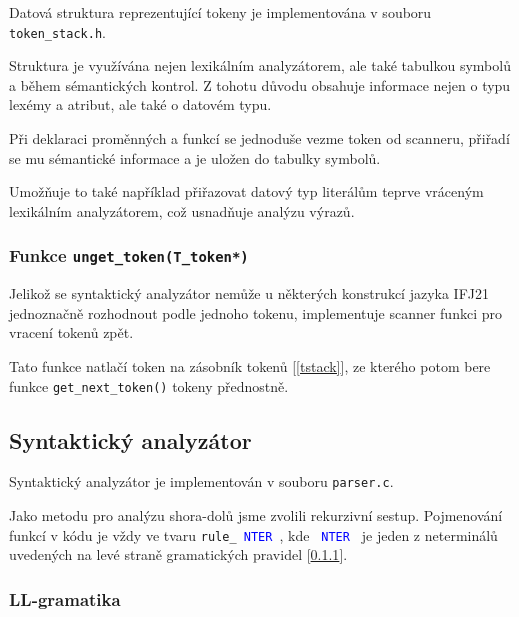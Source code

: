 \documentclass[a4paper]{article}
\theoremstyle{definition}
\newcommand{\nter}[1]{\textcolor{blue}{\,#1\,}}
\begin{document}
Datová struktura reprezentující tokeny je implementována v souboru \texttt{token\_stack.h}.

Struktura je využívána nejen lexikálním analyzátorem, ale také tabulkou symbolů a během sémantických kontrol. Z tohotu důvodu obsahuje informace nejen o typu lexémy a atribut, ale také o datovém typu.

Při deklaraci proměnných a funkcí se jednoduše vezme token od scanneru, přiřadí se mu sémantické informace a je uložen do tabulky symbolů.

Umožňuje to také například přiřazovat datový typ literálům teprve vráceným lexikálním analyzátorem, což usnadňuje analýzu výrazů.


\subsubsection{Funkce \texttt{unget\_token(T\_token*)}}

Jelikož se syntaktický analyzátor nemůže u některých konstrukcí jazyka IFJ21 jednoznačně rozhodnout podle jednoho tokenu, implementuje scanner funkci pro vracení tokenů zpět.

Tato funkce natlačí token na zásobník tokenů [\ref{tstack}], ze kterého potom bere funkce \texttt{get\_next\_token()} tokeny přednostně.

\subsection{Syntaktický analyzátor}

Syntaktický analyzátor je implementován v souboru \texttt{parser.c}.

Jako metodu pro analýzu shora-dolů jsme zvolili rekurzivní sestup. Pojmenování funkcí v kódu je vždy ve tvaru \texttt{rule\_\nter{NTER}}, kde \texttt{\nter{NTER}} je jeden z neterminálů uvedených na levé straně gramatických pravidel [\ref{sec_grammar}].

\subsubsection{LL-gramatika}\label{sec_grammar}
\end{document}
